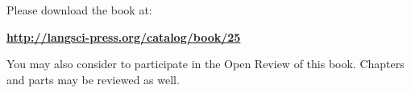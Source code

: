 \documentclass{article}
\begin{document}
Please download the book at:

\bigskip

\textbf{\url{http://langsci-press.org/catalog/book/25}}

\bigskip

You may also consider to participate in the Open Review of this book. Chapters and parts may be
reviewed as well.
\end{document}
